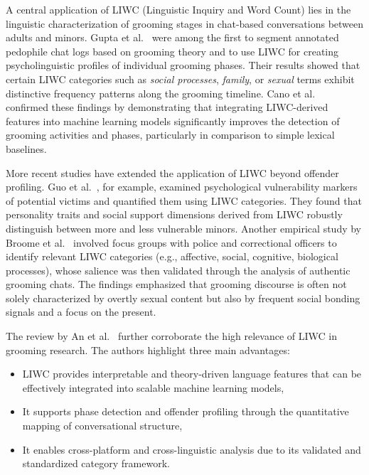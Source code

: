  A central application of LIWC (Linguistic Inquiry and Word Count) lies in the linguistic characterization of grooming stages in chat-based conversations between adults and minors. Gupta et al.~\cite{gupta2012characterizingpedophileconversationsinternet} were among the first to segment annotated pedophile chat logs based on grooming theory and to use LIWC for creating psycholinguistic profiles of individual grooming phases. Their results showed that certain LIWC categories such as \textit{social processes}, \textit{family}, or \textit{sexual} terms exhibit distinctive frequency patterns along the grooming timeline. Cano et al.~\cite{Cano2014} confirmed these findings by demonstrating that integrating LIWC-derived features into machine learning models significantly improves the detection of grooming activities and phases, particularly in comparison to simple lexical baselines. %

More recent studies have extended the application of LIWC beyond offender profiling. Guo et al.~\cite{guo2023text}, for example, examined psychological vulnerability markers of potential victims and quantified them using LIWC categories. %
 They found that personality traits and social support dimensions derived from LIWC robustly distinguish between more and less vulnerable minors.  %
 Another empirical study by Broome et al.~\cite{broome2020psycholinguistic} involved focus groups with police and correctional officers to identify relevant LIWC categories (e.g., affective, social, cognitive, biological processes), whose salience was then validated through the analysis of authentic grooming chats. The findings emphasized that grooming discourse is often not solely characterized by overtly sexual content but also by frequent social bonding signals and a focus on the present. %


The review by An et al.~\cite{an2025cybergrooming} further corroborate the high relevance of LIWC in grooming research. The authors highlight three main advantages:
\begin{itemize}
    \item LIWC provides interpretable and theory-driven language features that can be effectively integrated into scalable machine learning models,
    \item It supports phase detection and offender profiling through the quantitative mapping of conversational structure,
    \item It enables cross-platform and cross-linguistic analysis due to its validated and standardized category framework.
\end{itemize} %

